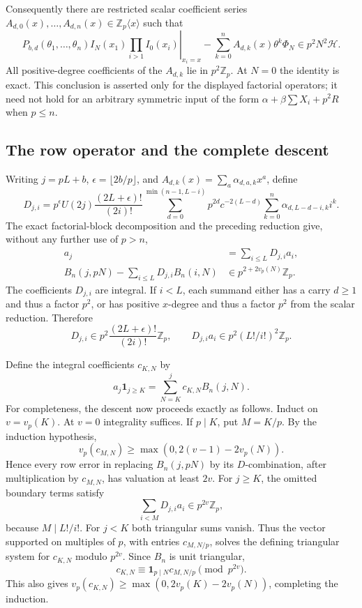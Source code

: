 \documentclass[11pt,a4paper]{article}
\theoremstyle{definition}\newtheorem{definition}[theorem]{Definition}
\theoremstyle{remark}\newtheorem{remark}[theorem]{Remark}
\numberwithin{equation}{section}
\begin{document}
Consequently there are restricted scalar coefficient series
$A_{d,0}(x),\ldots,A_{d,n}(x)\in\mathbb Z_p\langle x\rangle$
such that
\[
 \left.P_{b,d}(\theta_1,\ldots,\theta_n)
 I_N(x_1)\prod_{i>1}I_0(x_i)\right|_{x_i=x}
 -\sum_{k=0}^nA_{d,k}(x)\theta^k\Phi_N
 \in p^2N^2\mathcal H.
\]
All positive-degree coefficients of the $A_{d,k}$ lie in
$p^2\mathbb Z_p$. At $N=0$ the identity is exact.
This conclusion is asserted only for the displayed factorial operators;
it need not hold for an arbitrary symmetric input of the form
$\alpha+\beta\sum X_i+p^2R$ when $p\le n$.

\subsection{The row operator and the complete descent}
Writing $j=pL+b$, $\epsilon=\lfloor2b/p\rfloor$, and
$A_{d,k}(x)=\sum_a\alpha_{d,a,k}x^a$, define
\[
 D_{j,i}=p^\epsilon U(2j)\frac{(2L+\epsilon)!}{(2i)!}
 \sum_{d=0}^{\min(n-1,L-i)}p^{2d}c^{-2(L-d)}
 \sum_{k=0}^n\alpha_{d,L-d-i,k}i^k.
\]
The exact factorial-block decomposition and the preceding reduction
give, without any further use of $p>n$,
\begin{align*}
 a_j&=\sum_{i\le L}D_{j,i}a_i,\\
 B_n(j,pN)-\sum_{i\le L}D_{j,i}B_n(i,N)
   &\in p^{2+2v_p(N)}\mathbb Z_p.
\end{align*}
The coefficients $D_{j,i}$ are integral. If $i<L$, each summand either
has a carry $d\ge1$ and thus a factor $p^2$, or has positive $x$-degree
and thus a factor $p^2$ from the scalar reduction. Therefore
\[
 D_{j,i}\in p^2\frac{(2L+\epsilon)!}{(2i)!}\mathbb Z_p,
 \qquad
 D_{j,i}a_i\in p^2(L!/i!)^2\mathbb Z_p.
\]

Define the integral coefficients $c_{K,N}$ by
\[
 a_j\mathbf1_{j\ge K}=\sum_{N=K}^j c_{K,N}B_n(j,N).
\]
For completeness, the descent now proceeds exactly as follows. Induct
on $v=v_p(K)$. At $v=0$ integrality suffices. If $p\mid K$, put
$M=K/p$. By the induction hypothesis,
\[
 v_p(c_{M,N})\ge\max(0,2(v-1)-2v_p(N)).
\]
Hence every row error in replacing $B_n(j,pN)$ by its $D$-combination,
after multiplication by $c_{M,N}$, has valuation at least $2v$.
For $j\ge K$, the omitted boundary terms satisfy
\[
 \sum_{i<M}D_{j,i}a_i\in p^{2v}\mathbb Z_p,
\]
because $M\mid L!/i!$. For $j<K$ both triangular sums vanish. Thus
the vector supported on multiples of $p$, with entries $c_{M,N/p}$,
solves the defining triangular system for $c_{K,N}$ modulo $p^{2v}$.
Since $B_n$ is unit triangular,
\[
 c_{K,N}\equiv\mathbf1_{p\mid N}c_{M,N/p}\pmod{p^{2v}}.
\]
This also gives
$v_p(c_{K,N})\ge\max(0,2v_p(K)-2v_p(N))$, completing the induction.
\end{document}
